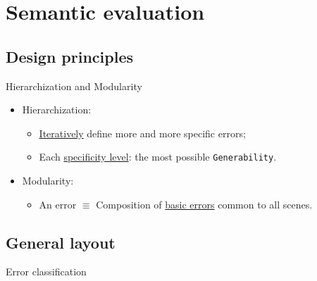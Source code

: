 \documentclass[10pt]{beamer}
\begin{document}
    \section{Semantic evaluation}
        \subsection{Design principles}
            \begin{frame}{Hierarchization and Modularity}
                \begin{itemize}[label=\(\blacktriangleright\), font=\color{IGNGreen}, itemsep=2em]
                    \item<1-> Hierarchization:
                        \begin{itemize}[label=\(\blacktriangleright\), font=\color{IGNGreen}, itemsep=2em]
                            \item<2-> \underline{Iteratively} define more and more specific errors;
                            \item<3-> Each \underline{specificity level}: the most possible \texttt{Generability}.
                        \end{itemize}
                    \item<4-> Modularity:
                        \begin{itemize}[label=\(\blacktriangleright\), font=\color{IGNGreen}, itemsep=2em]
                            \item<5-> An error \(\equiv\) Composition of \underline{basic errors} common to all scenes.
                        \end{itemize}
                \end{itemize}
            \end{frame}
        
        \subsection{General layout}
            \begin{frame}{Error classification}
                
            \end{frame}
\end{document}
